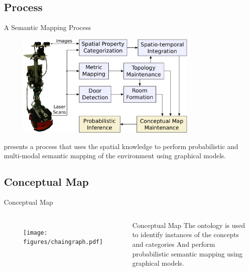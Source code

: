 \documentclass[compress]{beamer}
\begin{document}
\subsection{Process}
\begin{frame}{A Semantic Mapping Process}
  \begin{figure}
    \includegraphics[width=0.8\textwidth]{figures/dora-architecture.pdf}
  \end{figure}
  \cite{pronobis2011semmap} presents a process that uses the spatial knowledge
  to perform probabilistic and multi-modal semantic mapping of the environment
  using graphical models.
\end{frame}

\subsection{Conceptual Map}
\begin{frame}{Conceptual Map}
  \begin{columns}[c]
    \begin{figure}
      \texttt{[image: figures/chaingraph.pdf]}
    \end{figure}
    \begin{block}{Conceptual Map}
      The ontology is used to identify instances of the concepts and categories
      And perform probabilistic semantic mapping using graphical models.
    \end{block}
  \end{columns}

\end{frame}
\end{document}
